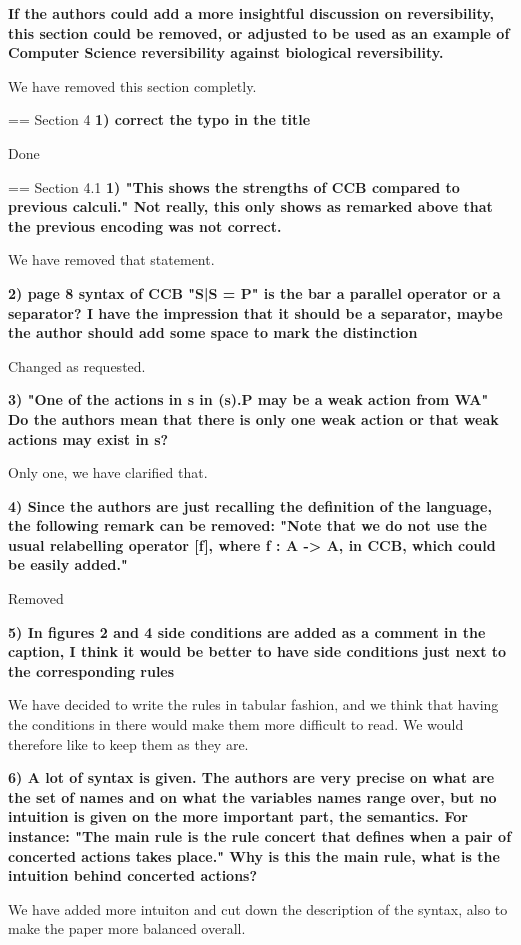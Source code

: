 \documentclass{article}
\begin{document}
\textbf{If the authors could add a more insightful discussion on reversibility, this section could be removed, or adjusted to be used as an example of Computer Science reversibility against biological reversibility.}

We have removed this section completly.

== Section 4
\textbf{1) correct the typo in the title}

Done

== Section 4.1
\textbf{1) "This shows the strengths of CCB compared to previous calculi."
Not really, this only shows as remarked above that the previous encoding was not correct.}

We have removed that statement.

\textbf{2) page 8 syntax of CCB "S|S = P" is the bar a parallel operator or a separator? 
I have the impression that it should be a separator, maybe the author should add some space to mark the distinction}

Changed as requested.

\textbf{3) "One of the actions in s in (s).P may be a weak action from WA" Do the authors mean that there is only one weak action or that weak actions may exist in s?}

Only one, we have clarified that.

\textbf{4) Since the authors are just recalling the definition of the language, the following remark can be removed:
"Note that we do not use the usual relabelling operator [f], where f : A -> A, in CCB, which could be easily added."}

Removed

\textbf{5) In figures 2 and 4 side conditions are added as a comment in the caption, I think it would be better to have side conditions just next to the corresponding rules}

We have decided to write the rules in tabular fashion, and we think that having the conditions in there would make them more difficult to read. We would therefore like to keep them as they are.

\textbf{6) A lot of syntax is given.  The authors are very precise on what are the set of names and on what the variables names range over, but no intuition is given on the more important part, the semantics.
For instance: "The main rule is the rule concert that defines when a pair of concerted actions takes place." Why is this the main rule, what is the intuition behind concerted actions?}

We have added more intuiton and cut down the description of the syntax, also to make the paper more balanced overall.
\end{document}
